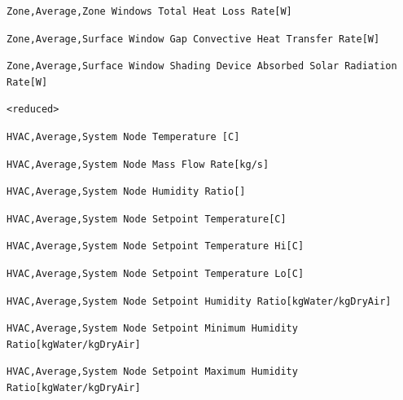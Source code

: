 \begin{lstlisting}
Zone,Average,Zone Windows Total Heat Loss Rate[W]
\end{lstlisting}

\begin{lstlisting}
Zone,Average,Surface Window Gap Convective Heat Transfer Rate[W]
\end{lstlisting}

\begin{lstlisting}
Zone,Average,Surface Window Shading Device Absorbed Solar Radiation Rate[W]
\end{lstlisting}

\begin{lstlisting}
<reduced>
\end{lstlisting}

\begin{lstlisting}
HVAC,Average,System Node Temperature [C]
\end{lstlisting}

\begin{lstlisting}
HVAC,Average,System Node Mass Flow Rate[kg/s]
\end{lstlisting}

\begin{lstlisting}
HVAC,Average,System Node Humidity Ratio[]
\end{lstlisting}

\begin{lstlisting}
HVAC,Average,System Node Setpoint Temperature[C]
\end{lstlisting}

\begin{lstlisting}
HVAC,Average,System Node Setpoint Temperature Hi[C]
\end{lstlisting}

\begin{lstlisting}
HVAC,Average,System Node Setpoint Temperature Lo[C]
\end{lstlisting}

\begin{lstlisting}
HVAC,Average,System Node Setpoint Humidity Ratio[kgWater/kgDryAir]
\end{lstlisting}

\begin{lstlisting}
HVAC,Average,System Node Setpoint Minimum Humidity Ratio[kgWater/kgDryAir]
\end{lstlisting}

\begin{lstlisting}
HVAC,Average,System Node Setpoint Maximum Humidity Ratio[kgWater/kgDryAir]
\end{lstlisting}

